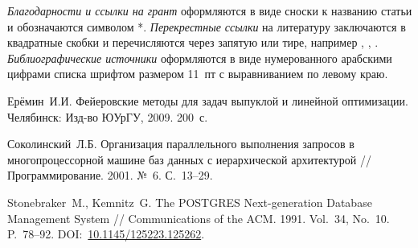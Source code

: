 \documentclass[11pt, oneside, a4paper]{article}
\begin{document}
\emph{Благодарности и ссылки на грант} оформляются в виде сноски к названию статьи и обозначаются символом *. \emph{Перекрестные ссылки} на литературу заключаются в квадратные скобки и перечисляются через запятую или тире, например \cite{eremin}, \cite{eremin,sokolinsky}, \cite{eremin,sokolinsky,stonebraker}. \emph{Библиографические источники} оформляются в виде нумерованного арабскими цифрами списка шрифтом размером 11~пт с выравниванием по левому краю.

\begin{biblio}

Ерёмин~И.И. Фейеровские методы для задач выпуклой и линейной оптимизации. 
Челябинск: Изд-во ЮУрГУ, 2009. 200~с.

Соколинский~Л.Б. Организация параллельного выполнения запросов в многопроцессорной 
машине баз данных с иерархической архитектурой // Программирование. 2001. №~6. С.~13--29.

Stonebraker~M., Kemnitz~G. The POSTGRES Next-generation Database Management System // Communications of the ACM. 1991. Vol.~34, No.~10. P.~78--92.
DOI:~\href{http://dx.doi.org/10.1145/125223.125262}{10.1145/125223.125262}.

\end{biblio}
\end{document}
